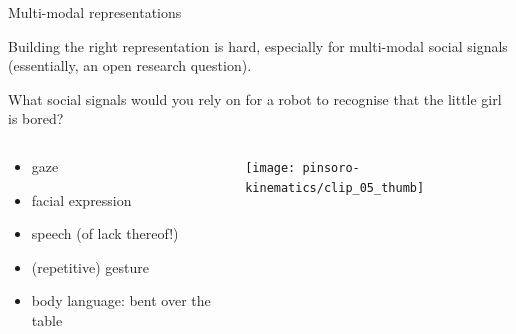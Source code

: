 \documentclass[compress]{beamer}
\begin{document}
\begin{frame}{Multi-modal representations}

    Building the right representation is hard, especially for multi-modal social
    signals (essentially, an open research
    question).

    \pause

    What social signals would you rely on for a robot to recognise that the
    little girl is bored?

    \pause

    \begin{columns}
        \begin{column}{0.5\linewidth}
    \begin{itemize}
        \item gaze
        \item facial expression
        \item speech (of lack thereof!)
        \item (repetitive) gesture
        \item body language: bent over the table
    \end{itemize}

        \end{column}
        \begin{column}{0.5\linewidth}
            \begin{center}
                \texttt{[image: pinsoro-kinematics/clip\_05\_thumb]}
            \end{center}
        \end{column}
    \end{columns}

\end{frame}
\end{document}

